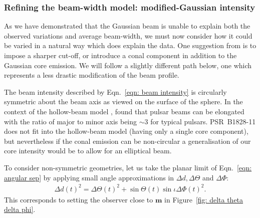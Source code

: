 \documentclass[../full_thesis/full_thesis.tex]{subfiles}
\begin{document}

\subsubsection{Refining the beam-width model: modified-Gaussian intensity}
\label{sec: refining the beam-width model}

As we have demonstrated that the Gaussian beam is unable to explain both the
observed variations and average beam-width, we must now consider how it could be
varied in a natural way which does explain the data. One suggestion from
\citet{Akgun2006} is to impose a sharper cut-off, or introduce a conal
component in addition to the Gaussian core emission.  We will follow a slightly
different path below, one which represents a less drastic modification of the
beam profile.


The beam intensity described by Eqn.~\eqref{eqn: beam intensity} is circularly
symmetric about the beam axis as viewed on the surface of the sphere. In the
context of the hollow-beam model \citep{Radhakrishnan1969}, \citet{Narayan1983}
found that pulsar beams can be elongated with the ratio of major to minor axis
being $\sim3$ for typical pulsars. PSR~B1828-11 does not fit into the hollow-beam
model (having only a single core component), but nevertheless if the conal
emission can be non-circular a generalisation of our core intensity would be
to allow for an elliptical beam.

To consider non-symmetric geometries, let us take the planar limit of
Eqn.~\eqref{eqn: angular sep} by
applying small angle approximations in $\Delta d, \Delta\Theta$ and
$\Delta\Phi$:
\begin{align}
\Delta d(t)^{2} = \Delta \Theta(t)^{2} + \sin\Theta(t) \sin\iota \Delta\Phi(t)^{2}.
\label{eqn: angular sep expansion}
\end{align}
This corresponds to setting the observer close to $\mathbf{m}$ in
Figure~\ref{fig: delta theta delta phi}.
\end{document}
